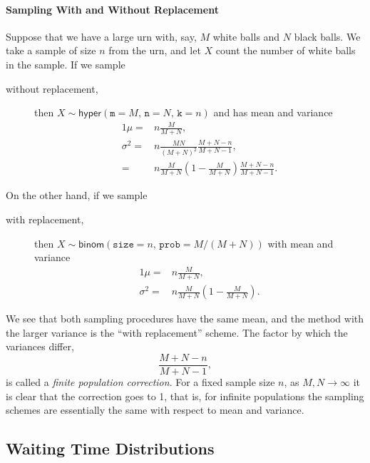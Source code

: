 \documentclass[captions=tableheading]{scrbook}
\begin{document}
\paragraph*{Sampling With and Without Replacement}
\label{sub:Sampling-With-and}

Suppose that we have a large urn with, say, \(M\) white balls and \(N\) black balls. We take a sample of size \(n\) from the urn, and let \(X\) count the number of white balls in the sample. If we sample
\begin{description}
\item[without replacement,] then \(X\sim\mathsf{hyper}(\mathtt{m=}M,\,\mathtt{n}=N,\,\mathtt{k}=n)\) and has mean and variance
     \begin{alignat*}{1}
     \mu= & n\frac{M}{M+N},\\
     \sigma^{2}= & n\frac{MN}{(M+N)^{2}}\frac{M+N-n}{M+N-1},\\
     = & n\frac{M}{M+N}\left(1-\frac{M}{M+N}\right)\frac{M+N-n}{M+N-1}.
     \end{alignat*}
\end{description}
On the other hand, if we sample
\begin{description}
\item[with replacement,] then \(X\sim\mathsf{binom}(\mathtt{size}=n,\,\mathtt{prob}=M/(M+N))\) with mean and variance
     \begin{alignat*}{1}
     \mu= & n\frac{M}{M+N},\\
     \sigma^{2}= & n\frac{M}{M+N}\left(1-\frac{M}{M+N}\right).
     \end{alignat*}
\end{description}
We see that both sampling procedures have the same mean, and the method with the larger variance is the ``with replacement'' scheme. The factor by which the variances differ,
\begin{equation}
\frac{M+N-n}{M+N-1},
\end{equation}
is called a \emph{finite population correction}. For a fixed sample size \(n\), as \(M,N\to\infty\) it is clear that the correction goes to 1, that is, for infinite populations the sampling schemes are essentially the same with respect to mean and variance.
\subsection{Waiting Time Distributions}
\label{sec-5-6-2}

\label{sec:Waiting-Time-Distributions}
\end{document}
